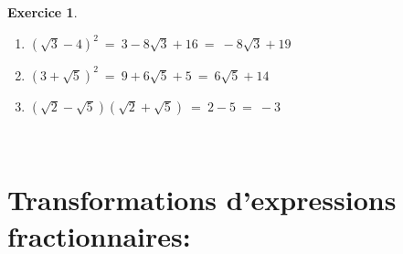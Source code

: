 \documentclass[10pt,a4paper]{article}
\theoremstyle{definition}
\theoremstyle{definition}
\newtheorem{exo}{Exercice}
\begin{document}
\begin{center}
\begin{minipage}[c]{0.4\linewidth}
\begin{exo}
				\begin{enumerate}
					\item $(\sqrt{3}-4)^2 \ = \ 3 -8\sqrt{3} +16 \ = \ -8\sqrt{3}+19$
					\item $(3+\sqrt{5})^2 \ = \  9 + 6\sqrt{5} +5 \ = \ 6\sqrt{5} + 14$
					\item $(\sqrt{2}-\sqrt{5})(\sqrt{2}+\sqrt{5}) \ = \ 2 - 5 \ = \ -3$
				\end{enumerate}
	
		\end{exo}

		
	\end{minipage}
\end{center}

\quad\\
\newpage
\section*{Transformations d'expressions fractionnaires:}	
\quad\\	
\end{document}
